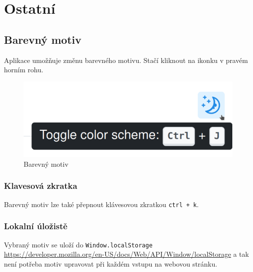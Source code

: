 
\section{Ostatní}\label{sec:ostatni}

\subsection{Barevný motiv}\label{subsec:barevny-motiv}
Aplikace umožňuje změnu barevného motivu.
Stačí kliknout na ikonku v pravém horním rohu.

\begin{figure}
    \centering
    \includegraphics[scale=0.4]{assets/images/color-scheme}
    \caption{Barevný motiv}\label{fig:barevny-motiv}
\end{figure}

\subsubsection{Klavesová zkratka}
Barevný motiv lze také přepnout klávesovou zkratkou \texttt{ctrl + k}.

\subsubsection{Lokalní úložistě}
Vybraný motiv se uloží do \texttt{Window.localStorage}
\url{https://developer.mozilla.org/en-US/docs/Web/API/Window/localStorage}
a tak není potřeba motiv upravovat při každém vstupu na webovou stránku.
